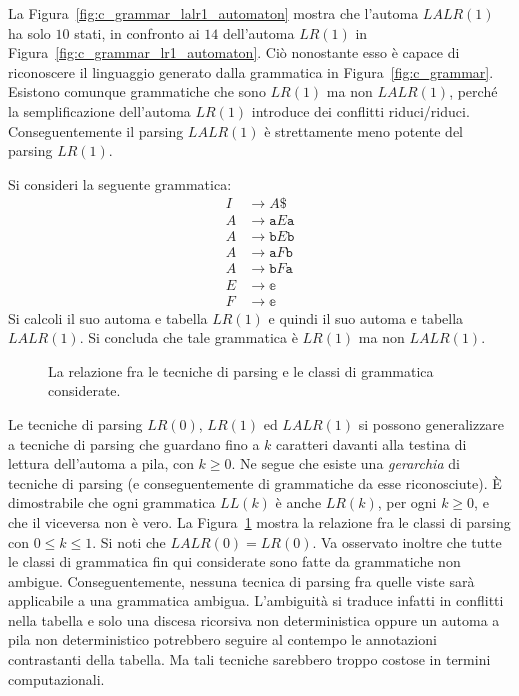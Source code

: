 La Figura~\ref{fig:c_grammar_lalr1_automaton} mostra che l'automa
$\mathit{LALR}(1)$
ha solo $10$ stati, in confronto ai $14$ dell'automa $\mathit{LR}(1)$ in
Figura~\ref{fig:c_grammar_lr1_automaton}. Ci\`o nonostante esso \`e capace di
riconoscere il linguaggio
generato dalla grammatica in Figura~\ref{fig:c_grammar}.
Esistono comunque grammatiche che sono $\mathit{LR}(1)$ ma non
$\mathit{LALR}(1)$, perch\'e la semplificazione dell'automa
$\mathit{LR}(1)$ introduce dei conflitti riduci/riduci.
Conseguentemente il parsing $\mathit{LALR}(1)$ \`e strettamente meno potente
del parsing $\mathit{LR}(1)$.
%
\begin{exercise}\label{ex:lr1_not_lalr1}
Si consideri la seguente grammatica:
\begin{align*}
I&\to A\mathtt{\$}\\
A&\to \mathtt{a}E\mathtt{a}\\
A&\to \mathtt{b}E\mathtt{b}\\
A&\to \mathtt{a}F\mathtt{b}\\
A&\to \mathtt{b}F\mathtt{a}\\
E&\to \mathbb{e}\\
F&\to \mathbb{e}
\end{align*}
Si calcoli il suo automa e tabella $\mathit{LR}(1)$ e quindi il suo automa e
tabella $\mathit{LALR}(1)$. Si concluda che tale grammatica \`e
$\mathit{LR}(1)$ ma non $\mathit{LALR}(1)$.
\end{exercise}
%
\begin{figure}[t]
\begin{center}
\end{center}
\caption{La relazione fra le tecniche di parsing e le classi di grammatica
         considerate.}
  \label{fig:all_classes}
\end{figure}

Le tecniche di parsing $\mathit{LR}(0)$, $\mathit{LR}(1)$ ed
$\mathit{LALR}(1)$ si possono generalizzare a tecniche di parsing che
guardano fino a $k$ caratteri davanti alla testina di lettura dell'automa
a pila, con $k\ge 0$. Ne segue che esiste una \emph{gerarchia} di
tecniche di parsing (e conseguentemente di grammatiche da esse riconosciute).
\`E dimostrabile che ogni grammatica $\mathit{LL}(k)$ \`e anche
$\mathit{LR}(k)$, per ogni $k\ge 0$, e che il viceversa non \`e vero.
La Figura~\ref{fig:all_classes} mostra la relazione fra le classi
di parsing con $0\le k\le 1$. Si noti che $\mathit{LALR(0)}=\mathit{LR}(0)$.
Va osservato inoltre che tutte le classi di grammatica fin qui considerate
sono fatte da grammatiche non ambigue. Conseguentemente, nessuna tecnica di
parsing fra quelle viste sar\`a applicabile a una grammatica ambigua.
L'ambiguit\`a si traduce infatti in conflitti nella tabella
e solo una discesa ricorsiva non deterministica oppure
un automa a pila non deterministico potrebbero seguire al contempo
le annotazioni contrastanti della tabella. Ma tali tecniche sarebbero
troppo costose in termini computazionali.

